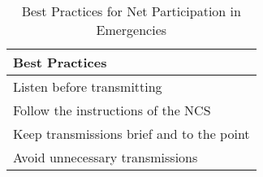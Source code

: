 \begin{table}[h!]
    \centering
    \begin{tabular}{|l|}
        \hline
        \textbf{Best Practices} \\
        \hline
        Listen before transmitting \\
        Follow the instructions of the NCS \\
        Keep transmissions brief and to the point \\
        Avoid unnecessary transmissions \\
        \hline
    \end{tabular}
    \caption{Best Practices for Net Participation in Emergencies}
    \label{tab:net-participation-best-practices}
\end{table}
